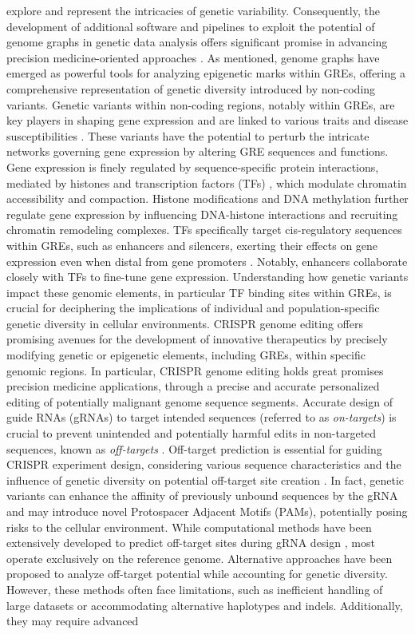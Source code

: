 \documentclass[a4paper, titlepage, openright]{book}
\begin{document}
explore and represent the intricacies of genetic variability. Consequently, the development of additional software and pipelines to exploit the potential of genome graphs in genetic data analysis offers significant promise in advancing precision medicine-oriented approaches \citep{yu2023human}. As mentioned, genome graphs have emerged as powerful tools for analyzing epigenetic marks within GREs, offering a comprehensive representation of genetic diversity introduced by non-coding variants. Genetic variants within non-coding regions, notably within GREs, are key players in shaping gene expression and are linked to various traits and disease susceptibilities \citep{weinhold2014genome,wienert2015editing}. These variants have the potential to perturb the intricate networks governing gene expression by altering GRE sequences and functions. Gene expression is finely regulated by sequence-specific protein interactions, mediated by histones and transcription factors (TFs) \citep{lambert2018human}, which modulate chromatin accessibility and compaction. Histone modifications and DNA methylation further regulate gene expression by influencing DNA-histone interactions and recruiting chromatin remodeling complexes. TFs specifically target cis-regulatory sequences within GREs, such as enhancers and silencers, exerting their effects on gene expression even when distal from gene promoters \citep{lambert2018human}. Notably, enhancers collaborate closely with TFs to fine-tune gene expression. Understanding how genetic variants impact these genomic elements, in particular TF binding sites within GREs, is crucial for deciphering the implications of individual and population-specific genetic diversity in cellular environments. CRISPR genome editing \citep{cong2013multiplex} offers promising avenues for the development of innovative therapeutics by precisely modifying genetic or epigenetic elements, including GREs, within specific genomic regions. In particular, CRISPR genome editing holds great promises precision medicine applications, through a precise and accurate personalized editing of potentially malignant genome sequence segments. Accurate design of guide RNAs (gRNAs) to target intended sequences (referred to as \emph{on-targets}) is crucial to prevent unintended and potentially harmful edits in non-targeted sequences, known as \emph{off-targets} \citep{pattanayak2013high,cho2014analysis}. Off-target prediction is essential for guiding CRISPR experiment design, considering various sequence characteristics and the influence of genetic diversity on potential off-target site creation \citep{scott2017implications}. In fact, genetic variants can enhance the affinity of previously unbound sequences by the gRNA and may introduce novel Protospacer Adjacent Motifs (PAMs), potentially posing risks to the cellular environment. While computational methods have been extensively developed to predict off-target sites during gRNA design \citep{hanna2020design}, most operate exclusively on the reference genome. Alternative approaches have been proposed to analyze off-target potential while accounting for genetic diversity. However, these methods often face limitations, such as inefficient handling of large datasets or accommodating alternative haplotypes and indels. Additionally, they may require advanced 
\end{document}
